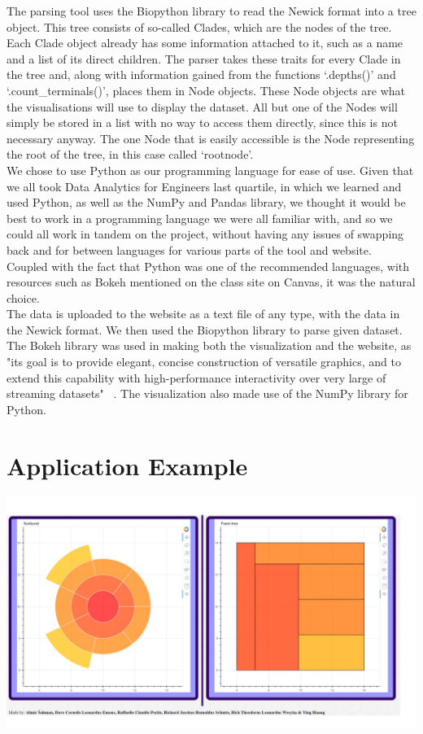 \documentclass[journal, 9pt]{vgtc}                %
\begin{document}
The parsing tool uses the Biopython library to read the Newick format into a tree object. This tree consists of so-called Clades, which are the nodes of the tree. Each Clade object already has some information attached to it, such as a name and a list of its direct children. The parser takes these traits for every Clade in the tree and, along with information gained from the functions ‘.depths()’ and ‘.count_terminals()’, places them in Node objects. These Node objects are what the visualisations will use to display the dataset. All but one of the Nodes will simply be stored in a list with no way to access them directly, since this is not necessary anyway. The one Node that is easily accessible is the Node representing the root of the tree, in this case called ‘rootnode’.\\
We chose to use Python as our programming language for ease of use. Given that we all took Data Analytics for Engineers last quartile, in which
we learned and used Python, as well as the NumPy and Pandas library, we thought it would be best to work in a programming language we were
all familiar with, and so we could all work in tandem on the project, without having any issues of swapping back and for between languages for 
various parts of the tool and website. Coupled with the fact that Python was one of the recommended languages, with resources such as Bokeh 
mentioned on the class site on Canvas, it was the natural choice.\\
The data is uploaded to the website as a text file of any type, with the data in the Newick format. We then used the Biopython library to parse
given dataset. The Bokeh  library was used in making both the visualization and the website, as "its goal is to provide elegant, concise construction of versatile graphics,
and to extend this capability with high-performance interactivity over very large of streaming datasets" ~\cite{bokeh}. The visualization also made use 
of the NumPy library for Python.\\


\section{Application Example}

\includegraphics[width=\linewidth]{vis1.png}
\end{document}
